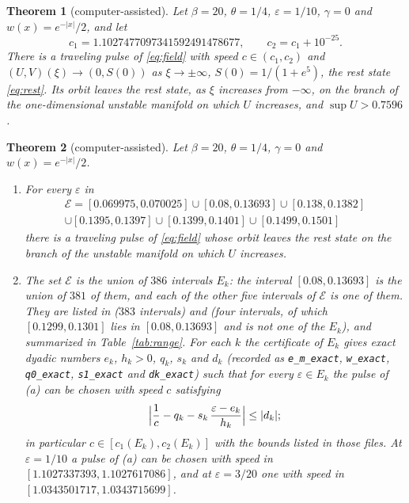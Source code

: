 \documentclass[11pt]{article}
\newtheorem{theorem}{Theorem}
\theoremstyle{definition}
\newcommand{\eps}{\varepsilon}
\begin{document}
\begin{theorem}[computer-assisted]\label{thm:fast}
Let $\beta = 20$, $\theta = 1/4$, $\eps = 1/10$, $\gamma = 0$ and $w(x) = e^{-|x|}/2$, and let
\[
  c_1 = 1.1027477097341592491478677, \qquad c_2 = c_1 + 10^{-25}.
\]
There is a traveling pulse of \eqref{eq:field} with speed $c \in (c_1, c_2)$ and $(U, V)(\xi) \to (0, S(0))$ as $\xi \to \pm\infty$, $S(0) = 1/(1 + e^5)$, the rest state \eqref{eq:rest}. Its orbit leaves the rest state, as $\xi$ increases from $-\infty$, on the branch of the one-dimensional unstable manifold on which $U$ increases, and $\sup U > 0.7596$.
\end{theorem}

\begin{theorem}[computer-assisted]\label{thm:range}
Let $\beta = 20$, $\theta = 1/4$, $\gamma = 0$ and $w(x) = e^{-|x|}/2$.
\begin{enumerate}
\item[(a)] For every $\eps$ in
\begin{multline*}
  \mathcal{E} = [0.069975, 0.070025] \cup [0.08, 0.13693] \cup [0.138, 0.1382] \\
  \cup [0.1395, 0.1397] \cup [0.1399, 0.1401] \cup [0.1499, 0.1501]
\end{multline*}
there is a traveling pulse of \eqref{eq:field} whose orbit leaves the rest state on the branch of the unstable manifold on which $U$ increases.
\item[(b)] The set $\mathcal{E}$ is the union of $386$ intervals $E_k$: the interval $[0.08, 0.13693]$ is the union of $381$ of them, and each of the other five intervals of $\mathcal{E}$ is one of them. They are listed in  ($383$ intervals) and  (four intervals, of which $[0.1299, 0.1301]$ lies in $[0.08, 0.13693]$ and is not one of the $E_k$), and summarized in Table~\ref{tab:range}. For each $k$ the certificate of $E_k$ gives exact dyadic numbers $e_k$, $h_k > 0$, $q_k$, $s_k$ and $d_k$ (recorded as \texttt{e\_m\_exact}, \texttt{w\_exact}, \texttt{q0\_exact}, \texttt{s1\_exact} and \texttt{dk\_exact}) such that for every $\eps \in E_k$ the pulse of (a) can be chosen with speed $c$ satisfying
\[
  \Bigl|\frac1c - q_k - s_k\,\frac{\eps - e_k}{h_k}\Bigr| \le |d_k| ;
\]
in particular $c \in [c_1(E_k), c_2(E_k)]$ with the bounds listed in those files. At $\eps = 1/10$ a pulse of (a) can be chosen with speed in $[1.1027337393, 1.1027617086]$, and at $\eps = 3/20$ one with speed in $[1.0343501717,\allowbreak 1.0343715699]$.
\end{enumerate}
\end{theorem}
\end{document}
